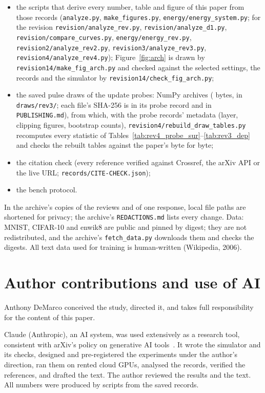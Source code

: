 \begin{sloppypar}
\begin{itemize}
\item the scripts that derive every number, table and figure of this paper from those records (\texttt{analyze.py},
      \texttt{make\_figures.py}, \texttt{energy/energy\_system.py}; for the revision \texttt{revision/analyze\_rev.py},
      \texttt{revision/analyze\_d1.py}, \texttt{revision/compare\_curves.py}, \texttt{energy/energy\_rev.py},
      \texttt{revision2/analyze\_rev2.py}, \texttt{revision3/analyze\_rev3.py}, \texttt{revision4/analyze\_rev4.py}); Figure~\ref{fig:arch} is drawn by \texttt{revision14/make\_fig\_arch.py} and
      checked against the selected settings, the records and the simulator by \texttt{revision14/check\_fig\_arch.py};
\item the saved pulse draws of the update probes: \RZDrawN{} NumPy archives (\RZDrawBytes{} bytes, in
      \texttt{draws/rev3/}; each file's SHA-256 is in its probe record and in \texttt{PUBLISHING.md}), from which, with the probe records' metadata (layer, clipping figures,
      bootstrap counts), \texttt{revision4/rebuild\_draw\_tables.py} recomputes every statistic of
      Tables~\ref{tab:rev4_probe_sur}--\ref{tab:rev3_dep} and checks the rebuilt tables against the paper's byte for byte;
\item the citation check (every reference verified against Crossref, the arXiv API or the live URL;
      \texttt{records/CITE-CHECK.json});
\item the bench protocol.
\end{itemize}
In the archive's copies of the reviews and of one response, local file paths are shortened for privacy; the archive's
\texttt{REDACTIONS.md} lists every change. Data: MNIST, CIFAR-10 and enwik8 are public and pinned by digest; they are not
redistributed, and the archive's \texttt{fetch\_data.py} downloads them and checks the digests. All text data used for training
is human-written (Wikipedia, 2006).

\end{sloppypar}

\section*{Author contributions and use of AI}
\ifdefined\arxivvariant
Anthony DeMarco conceived the study, directed it, and takes full responsibility for the content of this paper.

Claude (Anthropic), an AI system, was used extensively as a research tool, consistent with arXiv's policy on generative AI
tools~\cite{arxiv_policy}. It wrote the simulator and its checks, designed and pre-registered the experiments under the
author's direction, ran them on rented cloud GPUs, analysed the records, verified the references, and drafted the text. The
author reviewed the results and the text. All numbers were produced by scripts from the saved records.

